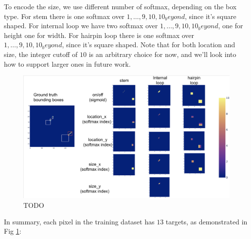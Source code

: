 \documentclass[12pt]{article}
\begin{document}
To encode the size, we use different number of softmax, depending on the box type.
For stem there is one softmax over $1, \dots, 9, 10, 10_beyond$, since it's square shaped.
For internal loop we have two softmax over $1, \dots, 9, 10, 10_beyond$, one for height one for width.
For hairpin loop there is one softmax over $1, \dots, 9, 10, 10_beyond$, since it's square shaped.
Note that for both location and size, the integer cutoff of $10$ is an arbitrary choice for now,
and we'll look into how to support larger ones in future work.

\begin{figure}[h]
    \centering
    \includegraphics[width=\textwidth]{plot/training_pixel_targets.png}
    \caption{TODO}
    \label{fig:training_pixel_targets}
    \centering
\end{figure}

In summary, each pixel in the training dataset has $13$ targets,
as demonstrated in Fig \ref{fig:training_pixel_targets}:
\end{document}
